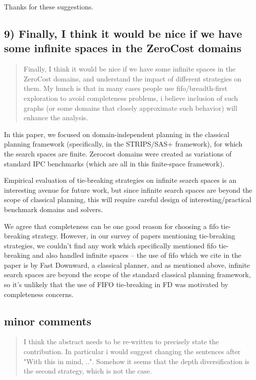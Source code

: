 \documentclass{article}
\begin{document}
Thanks for these suggestions. 


\subsection{9) Finally, I think it would be nice if we have some infinite spaces in the ZeroCost domains}
\label{sec:orgheadline23}

\begin{quote}
 Finally, I think it would be nice if we have some infinite spaces
in the ZeroCost domains, and understand the impact of different
strategies on them. My hunch is that in many cases people use
fifo/breadth-first exploration to avoid completeness problems, i
believe inclusion of such graphs (or some domains that closely
approximate such behavior) will enhance the analysis.
\end{quote}


In this paper, we focused on domain-independent planning in the classical planning framework (specifically, in the STRIPS/SAS+ framework), for which the search spaces are finite.
Zerocost domains were created as variations of standard IPC benchmarks (which are all in this finite-space framework).

Empirical evaluation of tie-breaking strategies on infinite search
spaces is an interesting avenue for future work, but 
since infinite search spaces are beyond the scope of classical planning, this will require
careful design of interesting/practical benchmark domains and solvers.

We agree that completeness can be one good reason for choosing a  fifo tie-breaking strategy.
However, in our survey of papers mentioning tie-breaking strategies, we couldn't find any work 
which specifically mentioned fifo tie-breaking and also handled infinite spaces -- 
the use of fifo which we cite in the paper is by Fast Downward, a classical planner, and as mentioned above, 
infinite search spaces are beyond the scope of the standard classical planning framework, so it's unlikely that the use of FIFO
tie-breaking in FD was motivated by completeness concerns.


\subsection{minor comments}
\label{sec:orgheadline24}

\begin{quote}
 I think the abstract needs to be re-written to precisely state the
contribution. In particular i would suggest changing the sentences
after "With this in mind, ..". Somehow it seems that the depth
diversification is the second strategy, which is not the case.
\end{quote}
\end{document}
